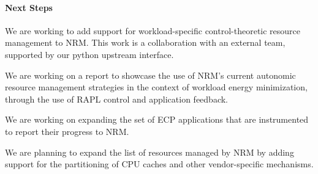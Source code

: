 \paragraph{Next Steps}

We are working to add support for workload-specific control-theoretic
resource management to NRM. This work is a collaboration with an external
team, supported by our python upstream interface.

We are working on a report to showcase the use of NRM's current autonomic
resource management strategies in the context of workload energy minimization,
through the use of RAPL control and application feedback.

We are working on expanding the set of ECP applications that are instrumented
to report their progress to NRM.

We are planning to expand the list of resources managed by NRM by
adding support for the partitioning of CPU caches and other vendor-specific
mechanisms.
